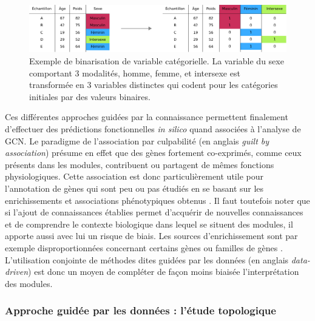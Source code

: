 \begin{figure}
    \centering
    \includegraphics[width=\textwidth]{img/intro/3_coexpr/intro_3_coexpr_binarisation.pdf}
    \caption[Exemple de binarisation de variable catégorielle]{Exemple de binarisation de variable catégorielle. La variable du sexe comportant 3 modalités, homme, femme, et intersexe est transformée en 3 variables distinctes qui codent pour les catégories initiales par des valeurs binaires.}
    \label{fig:binarisation}
\end{figure}

Ces différentes approches guidées par la connaissance permettent finalement d'effectuer des prédictions fonctionnelles \textit{in silico} quand associées à l'analyse de \acrshort{GCN}. Le paradigme de l'association par culpabilité (en anglais \textit{guilt by association}) présume en effet que des gènes fortement co-exprimés, comme ceux présents dans les modules, contribuent ou partagent de mêmes fonctions physiologiques\cite{Ballouz2015}. Cette association est donc particulièrement utile pour l'annotation de gènes qui sont peu ou pas étudiés en se basant sur les enrichissements et associations phénotypiques obtenus \cite{Wolfe2005}. Il faut toutefois noter que si l'ajout de connaissances établies permet d'acquérir de nouvelles connaissances et de comprendre le contexte biologique dans lequel se situent des modules, il apporte aussi avec lui un risque de biais. Les sources d'enrichissement sont par exemple disproportionnées concernant certains gènes ou familles de gènes \cite{Timmons2015Dec}. L'utilisation conjointe de méthodes dites guidées par les données (en anglais \textit{data-driven}) est donc un moyen de compléter de façon moins biaisée l'interprétation des modules.


\subsubsection{Approche guidée par les données : l'étude topologique}


